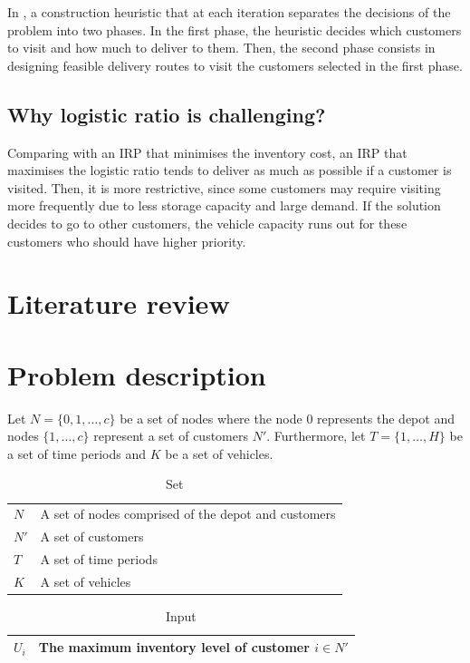\documentclass{article}
\begin{document}
In \cite{alvarez2018iterated}, a construction heuristic that at each iteration separates the decisions of the problem into two phases. In the first phase, the heuristic decides which customers to visit and how much to deliver to them. Then, the second phase consists in designing feasible delivery routes to visit the customers selected in the first phase.

\subsection{Why logistic ratio is challenging?}

Comparing with an IRP that minimises the inventory cost, an IRP that maximises the logistic ratio tends to deliver as much as possible if a customer is visited. Then, it is more restrictive, since some customers may require visiting more frequently due to less storage capacity and large demand. If the solution decides to go to other customers, the vehicle capacity runs out for these customers who should have higher priority.

\section{Literature review}


\section{Problem description}

Let $N=\{0, 1,\dots,c\}$ be a set of nodes where the node $0$ represents the depot and nodes $\{1,\dots,c\}$ represent a set of customers $N'$. Furthermore, let $T =\{1,\dots,H\}$ be a set of time periods and $K$ be a set of vehicles.



\begin{table}[ht]\caption{Set}
\begin{tabular}{ p{3cm}p{9cm}}
\toprule%
$N$ & A set of nodes comprised of the depot and customers\tabularnewline 
$N'$ & A set of customers \tabularnewline 
$T$ & A set of time periods\tabularnewline 
$K$ & A set of vehicles\tabularnewline 
\hline
\end{tabular}
\end{table}

\begin{table}[ht]\caption{Input}
\begin{tabular}{ p{3cm}p{9cm}}
\toprule%
$U_i$ & The maximum inventory level of customer $i\in N'$ \tabularnewline
\hline
\end{tabular}
\end{table}
\end{document}
